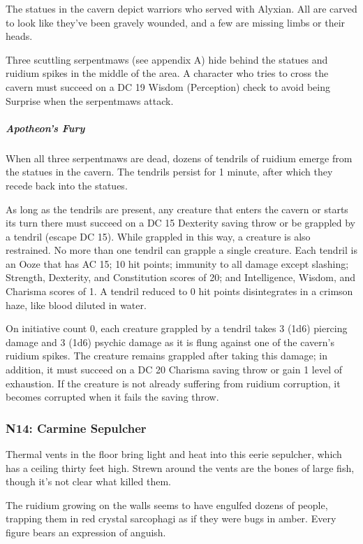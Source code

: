 \documentclass[10pt,a4paper,twoside,fancy,bg=print,twocolumn,openany,nodeprecatedcode]{dndbook}
\begin{document}
The statues in the cavern depict warriors who served with Alyxian. All are carved to look like they've been gravely wounded, and a few are missing limbs or their heads.

Three scuttling serpentmaws (see appendix A) hide behind the statues and ruidium spikes in the middle of the area. A character who tries to cross the cavern must succeed on a DC 19 Wisdom (Perception) check to avoid being Surprise when the serpentmaws attack.

\subparagraph{Apotheon's Fury}
When all three serpentmaws are dead, dozens of tendrils of ruidium emerge from the statues in the cavern. The tendrils persist for 1 minute, after which they recede back into the statues.

As long as the tendrils are present, any creature that enters the cavern or starts its turn there must succeed on a DC 15 Dexterity saving throw or be grappled by a tendril (escape DC 15). While grappled in this way, a creature is also restrained. No more than one tendril can grapple a single creature. Each tendril is an Ooze that has AC 15; 10 hit points; immunity to all damage except slashing; Strength, Dexterity, and Constitution scores of 20; and Intelligence, Wisdom, and Charisma scores of 1. A tendril reduced to 0 hit points disintegrates in a crimson haze, like blood diluted in water.

On initiative count 0, each creature grappled by a tendril takes 3 (1d6) piercing damage and 3 (1d6) psychic damage as it is flung against one of the cavern's ruidium spikes. The creature remains grappled after taking this damage; in addition, it must succeed on a DC 20 Charisma saving throw or gain 1 level of exhaustion. If the creature is not already suffering from ruidium corruption, it becomes corrupted when it fails the saving throw.

\subsubsection{N14: Carmine Sepulcher}
\begin{DndReadAloud}{}
Thermal vents in the floor bring light and heat into this eerie sepulcher, which has a ceiling thirty feet high. Strewn around the vents are the bones of large fish, though it's not clear what killed them.

The ruidium growing on the walls seems to have engulfed dozens of people, trapping them in red crystal sarcophagi as if they were bugs in amber. Every figure bears an expression of anguish.

\end{DndReadAloud}
\end{document}
